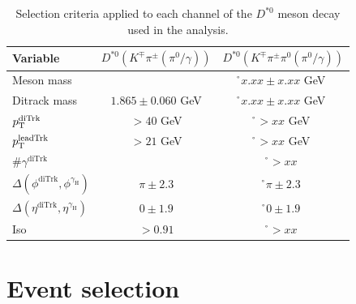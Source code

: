 \begin{table}[!ht]
    \centering
    \begin{tabular}{|l|c|c|}
        \hline
        \cellcolor{lightgray}Variable & \cellcolor{lightgray}$D^{*0}(K^{\mp}\pi^{\pm}{\scriptstyle(\pi^{0}/\gamma)})$ & \cellcolor{lightgray}$D^{*0}(K^{\mp}\pi^{\pm}\pi^{0}{\scriptstyle(\pi^{0}/\gamma)})$ \\ \hline
        Meson mass                                              &                   &\r $x.xx\pm x.xx$ GeV  \\
        Ditrack mass                                            &$1.865\pm0.060$ GeV&\r $x.xx\pm x.xx$ GeV  \\
        $p_\text{T}^{\text{diTrk}}$                                  &$>40$ GeV          &\r $>xx$ GeV           \\
        $p_\text{T}^{\text{leadTrk}}$                                &$>21$ GeV          &\r $>xx$ GeV           \\
        $\#\gamma^{\text{diTrk}}$                               &                   &\r $>xx$               \\
        $\Delta(\phi^{\text{diTrk}}, \phi^{\gamma_\text{H}})$   &$\pi\pm2.3$    &\r $\pi\pm2.3$     \\
        $\Delta(\eta^{\text{diTrk}}, \eta^{\gamma_\text{H}})$   &$0\pm1.9$          &\r $0\pm1.9$           \\
        Iso                                                     &$>0.91$            &\r $>  xx$             \\
        \hline
        \end{tabular}
    \caption{Selection criteria applied to each channel of the $D^{*0}$ meson decay used in the analysis.}
    \label{tab:meson_selection_2}
\end{table}




\section{Event selection}\label{sec:event_selection}

